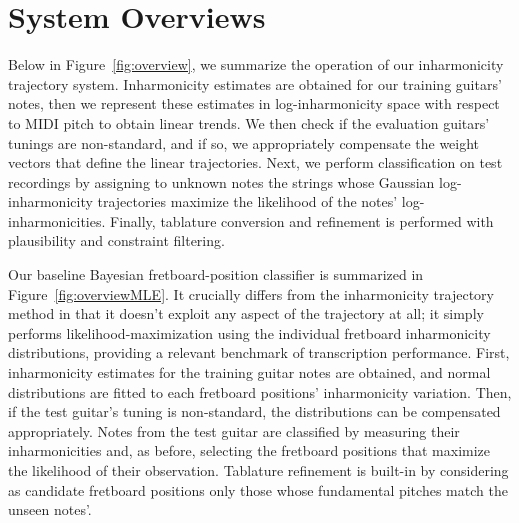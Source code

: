 \documentclass[12pt]{cmuthesis}
\begin{document}
\section{System Overviews}
Below in Figure~\ref{fig:overview}, we summarize the operation of our inharmonicity trajectory system. Inharmonicity estimates are obtained for our training guitars' notes, then we represent these estimates in log-inharmonicity space with respect to MIDI pitch to obtain linear trends. We then check if the evaluation guitars' tunings are non-standard, and if so, we appropriately compensate the weight vectors that define the linear trajectories. Next, we perform classification on test recordings by assigning to unknown notes the strings whose Gaussian log-inharmonicity trajectories maximize the likelihood of the notes' log-inharmonicities. Finally, tablature conversion and refinement is performed with plausibility and constraint filtering.

Our baseline Bayesian fretboard-position classifier is summarized in Figure~\ref{fig:overviewMLE}. It crucially differs from the inharmonicity trajectory method in that it doesn't exploit any aspect of the trajectory at all; it simply performs likelihood-maximization using the individual fretboard inharmonicity distributions, providing a relevant benchmark of transcription performance. First, inharmonicity estimates for the training guitar notes are obtained, and normal distributions are fitted to each fretboard positions' inharmonicity variation. Then, if the test guitar's tuning is non-standard, the distributions can be compensated appropriately. Notes from the test guitar are classified by measuring their inharmonicities and, as before, selecting the fretboard positions that maximize the likelihood of their observation. Tablature refinement is built-in by considering as candidate fretboard positions only those whose fundamental pitches match the unseen notes'. 
\end{document}
